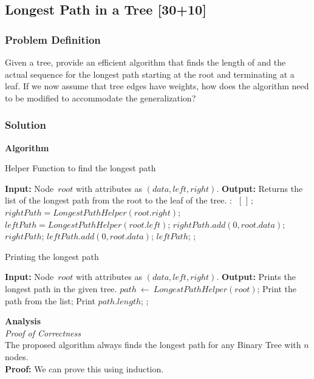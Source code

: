 \documentclass{article}
\begin{document}
\subsection*{Longest Path in a Tree [30+10]} 
\subsubsection{Problem Definition}
Given a tree, provide an efficient algorithm that finds the length of and the actual sequence for the longest path starting at the root and terminating at a leaf. If we now assume that tree edges have weights, how does the algorithm need to be modified to accommodate the generalization?
\subsubsection*{Solution}
\textbf{Algorithm}

\begin{algorithm}
\caption{Helper Function to find the longest path}
\label{alg:lpathhelp}
\begin{algorithmic}[1]
\State \textbf{Input:} Node\ $root$ with attributes as $(data, left, right)$.
\State \textbf{Output:} Returns the list of the longest path from the root to the leaf of the tree.
:
\State \Return\ [\ ] ;
\EndIf
\State $rightPath = LongestPathHelper(root.right)$;
\State $leftPath = LongestPathHelper(root.left)$;
\State $rightPath.add(0, root.data)$; 
\State \Return $rightPath$;
\Else
\State $leftPath.add(0, root.data)$; 
\State \Return $leftPath$; 
\EndIf
\State \Return;
\EndFunction
\end{algorithmic}
\end{algorithm}

\begin{algorithm}
\caption{Printing the longest path}
\label{alg:lpath}
\begin{algorithmic}[1]
\State \textbf{Input:} Node\ $root$ with attributes as $(data, left, right)$.
\State \textbf{Output:} Prints the longest path in the given tree.
\State $path\ \leftarrow\ LongestPathHelper(root)$;
\State Print the path from the list;
\State Print $path.length$;
\State \Return;
\end{algorithmic}
\end{algorithm}

\textbf{Analysis}\\
\textit{Proof of Correctness}\\
The proposed algorithm always finds the longest path for any Binary Tree with $n$ nodes.\\
\textbf{Proof:} We can prove this using induction.\\
\end{document}
